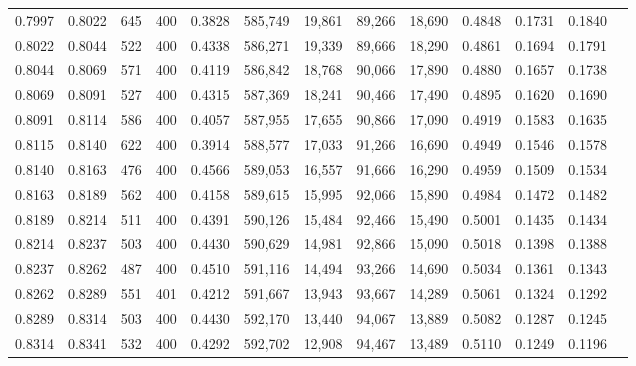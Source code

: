 \begin{tabular}{rrrrrrrrrrrrr}
0.7997 & 0.8022 &    645 & 400 &                                     0.3828 & 585,749 &  19,861 &  89,266 &  18,690 & 0.4848 & 0.1731 & 0.1840 \\
0.8022 & 0.8044 &    522 & 400 &                                     0.4338 & 586,271 &  19,339 &  89,666 &  18,290 & 0.4861 & 0.1694 & 0.1791 \\
0.8044 & 0.8069 &    571 & 400 &                                     0.4119 & 586,842 &  18,768 &  90,066 &  17,890 & 0.4880 & 0.1657 & 0.1738 \\
0.8069 & 0.8091 &    527 & 400 &                                     0.4315 & 587,369 &  18,241 &  90,466 &  17,490 & 0.4895 & 0.1620 & 0.1690 \\
0.8091 & 0.8114 &    586 & 400 &                                     0.4057 & 587,955 &  17,655 &  90,866 &  17,090 & 0.4919 & 0.1583 & 0.1635 \\
0.8115 & 0.8140 &    622 & 400 &                                     0.3914 & 588,577 &  17,033 &  91,266 &  16,690 & 0.4949 & 0.1546 & 0.1578 \\
0.8140 & 0.8163 &    476 & 400 &                                     0.4566 & 589,053 &  16,557 &  91,666 &  16,290 & 0.4959 & 0.1509 & 0.1534 \\
0.8163 & 0.8189 &    562 & 400 &                                     0.4158 & 589,615 &  15,995 &  92,066 &  15,890 & 0.4984 & 0.1472 & 0.1482 \\
0.8189 & 0.8214 &    511 & 400 &                                     0.4391 & 590,126 &  15,484 &  92,466 &  15,490 & 0.5001 & 0.1435 & 0.1434 \\
0.8214 & 0.8237 &    503 & 400 &                                     0.4430 & 590,629 &  14,981 &  92,866 &  15,090 & 0.5018 & 0.1398 & 0.1388 \\
0.8237 & 0.8262 &    487 & 400 &                                     0.4510 & 591,116 &  14,494 &  93,266 &  14,690 & 0.5034 & 0.1361 & 0.1343 \\
0.8262 & 0.8289 &    551 & 401 &                                     0.4212 & 591,667 &  13,943 &  93,667 &  14,289 & 0.5061 & 0.1324 & 0.1292 \\
0.8289 & 0.8314 &    503 & 400 &                                     0.4430 & 592,170 &  13,440 &  94,067 &  13,889 & 0.5082 & 0.1287 & 0.1245 \\
0.8314 & 0.8341 &    532 & 400 &                                     0.4292 & 592,702 &  12,908 &  94,467 &  13,489 & 0.5110 & 0.1249 & 0.1196 \\

\end{tabular}

